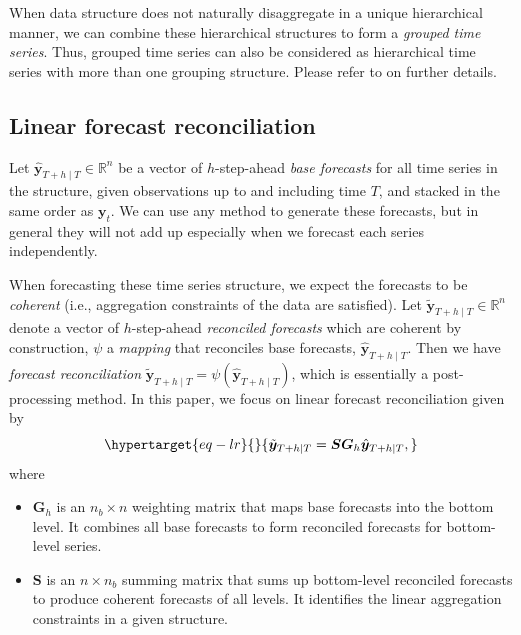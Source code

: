 \documentclass[
  12pt,
  11pt]{article}
\providecommand{\tightlist}{%
  \setlength{\itemsep}{0pt}\setlength{\parskip}{0pt}}\usepackage{longtable,booktabs,array}
\begin{document}
When data structure does not naturally disaggregate in a unique
hierarchical manner, we can combine these hierarchical structures to
form a \emph{grouped time series}. Thus, grouped time series can also be
considered as hierarchical time series with more than one grouping
structure. Please refer to \citet{Hyndman2021-fo} on further details.

\hypertarget{linear-forecast-reconciliation}{%
\subsection{Linear forecast
reconciliation}\label{linear-forecast-reconciliation}}

Let \(\hat{\bm{y}}_{T+h \mid T} \in \mathbb{R}^n\) be a vector of
\(h\)-step-ahead \emph{base forecasts} for all time series in the
structure, given observations up to and including time \(T\), and
stacked in the same order as \(\bm{y}_t\). We can use any method to
generate these forecasts, but in general they will not add up especially
when we forecast each series independently.

When forecasting these time series structure, we expect the forecasts to
be \emph{coherent} (i.e., aggregation constraints of the data are
satisfied). Let \(\tilde{\bm{y}}_{T+h \mid T} \in \mathbb{R}^n\) denote
a vector of \(h\)-step-ahead \emph{reconciled forecasts} which are
coherent by construction, \(\psi\) a \emph{mapping} that reconciles base
forecasts, \(\hat{\bm{y}}_{T+h \mid T}\). Then we have \emph{forecast
reconciliation}
\(\tilde{\bm{y}}_{T+h \mid T}=\psi(\hat{\bm{y}}_{T+h \mid T})\), which
is essentially a post-processing method. In this paper, we focus on
linear forecast reconciliation given by
\begin{equation}\protect\hypertarget{eq-lr}{}{
\tilde{\bm{y}}_{T+h \mid T} = \bm{S}\bm{G}_h\hat{\bm{y}}_{T+h \mid T},
}\label{eq-lr}\end{equation} where

\begin{itemize}
\tightlist
\item
  \(\bm{G}_h\) is an \(n_b \times n\) weighting matrix that maps base
  forecasts into the bottom level. It combines all base forecasts to
  form reconciled forecasts for bottom-level series.
\item
  \(\bm{S}\) is an \(n \times n_b\) summing matrix that sums up
  bottom-level reconciled forecasts to produce coherent forecasts of all
  levels. It identifies the linear aggregation constraints in a given
  structure.
\end{itemize}
\end{document}
